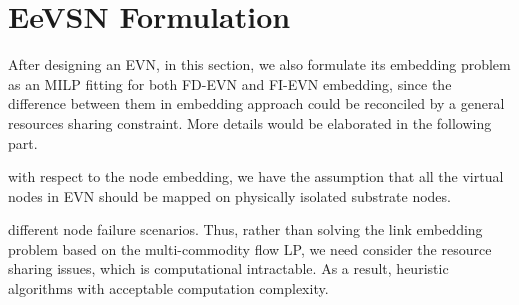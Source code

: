 \section{EeVSN Formulation}
After designing an EVN, in this section, we also formulate
its embedding problem as an MILP fitting for both FD-EVN
and FI-EVN embedding, since the difference between them in
embedding approach could be reconciled by a general resources
sharing constraint. More details would be elaborated in the following
part.

with respect to the node embedding, we
have the assumption that all the virtual nodes in EVN should be
mapped on physically isolated substrate nodes.

different node failure scenarios.
Thus, rather than solving the link embedding problem based
on the multi-commodity flow LP, we need consider the resource
sharing issues, which is computational intractable. As a result,
heuristic algorithms with acceptable computation complexity.

